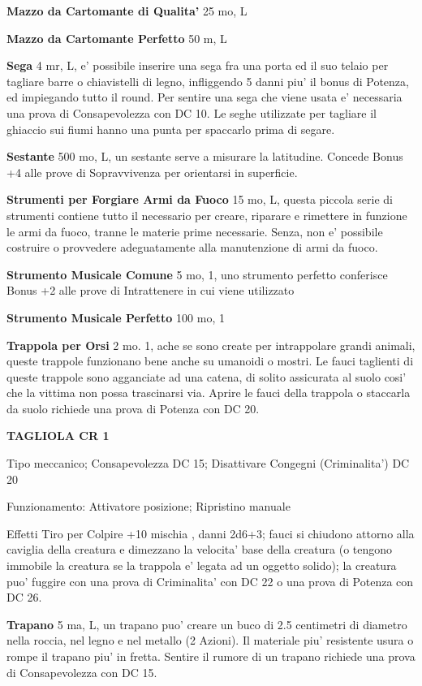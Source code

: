 \documentclass[a4paper,11pt,twoside,openany]{book}
\begin{document}
{		\textbf{Mazzo da Cartomante di Qualita'} 25 mo, L
		
		\textbf{Mazzo da Cartomante Perfetto} 50 m, L
		
		\textbf{Sega} 4 mr, L, e' possibile inserire una sega fra una porta ed il suo telaio per tagliare barre o chiavistelli di legno, infliggendo 5 danni piu' il bonus di Potenza, ed impiegando tutto il round. 
		Per sentire una sega che viene usata e' necessaria una prova di Consapevolezza con DC 10. Le seghe utilizzate per tagliare il ghiaccio sui fiumi hanno una punta per spaccarlo prima di segare.
		
		\textbf{Sestante} 500 mo, L, un sestante serve a misurare la latitudine. Concede Bonus +4 alle prove di Sopravvivenza per orientarsi in superficie.
		
		\textbf{Strumenti per Forgiare Armi da Fuoco} 15 mo, L, questa piccola serie di strumenti contiene tutto il necessario per creare, riparare e rimettere in funzione le armi da fuoco, tranne le materie prime necessarie. Senza, non e' possibile costruire o provvedere adeguatamente alla manutenzione di armi da fuoco.
		
		\textbf{Strumento Musicale Comune} 5 mo, 1, uno strumento perfetto conferisce Bonus +2 alle prove di Intrattenere in cui viene utilizzato
		
		\textbf{Strumento Musicale Perfetto} 100 mo, 1
		
		\textbf{Trappola per Orsi} 2 mo. 1, ache se sono create per intrappolare grandi animali, queste trappole funzionano bene anche su umanoidi o mostri. Le fauci taglienti di queste trappole sono agganciate ad una catena, di solito assicurata al suolo cosi' che la vittima non possa trascinarsi via. Aprire le fauci della trappola o staccarla da suolo richiede una prova di Potenza con DC 20.
		
		\textbf{TAGLIOLA CR 1}
		
		Tipo meccanico; Consapevolezza DC 15; Disattivare Congegni (Criminalita') DC 20
		
		Funzionamento:  Attivatore posizione; Ripristino manuale
		
		Effetti Tiro per Colpire +10 mischia , danni 2d6+3; fauci si chiudono attorno alla caviglia della creatura e dimezzano la velocita' base della creatura (o tengono immobile la creatura se la trappola e' legata ad un oggetto solido); la creatura puo' fuggire con una prova di Criminalita' con DC 22 o una prova di Potenza con DC 26.
		
		\textbf{Trapano} 5 ma, L, un trapano puo' creare un buco di 2.5 centimetri di diametro nella roccia, nel legno e nel metallo (2 Azioni). Il materiale piu' resistente usura o rompe il trapano piu' in fretta. Sentire il rumore di un trapano richiede una prova di Consapevolezza con DC 15.
		
}
\end{document}
